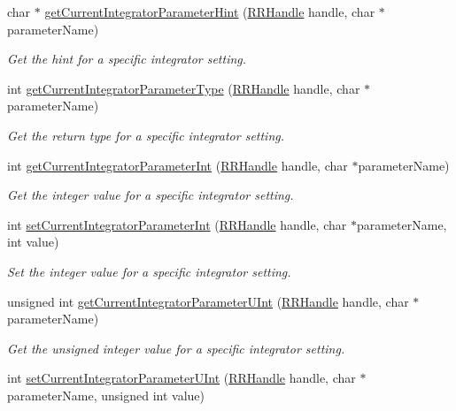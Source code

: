 \begin{DoxyCompactItemize}
char $\ast$ \hyperlink{group__simopts_ga4cc4c3b42b58f7ce266cff67cbc79c85}{get\+Current\+Integrator\+Parameter\+Hint} (\hyperlink{rrc__types_8h_a1d68f0592372208fa5a5f2799ea4b3ae}{R\+R\+Handle} handle, char $\ast$parameter\+Name)
\begin{DoxyCompactList}\small\item\em Get the hint for a specific integrator setting. \end{DoxyCompactList}\item 
int \hyperlink{group__simopts_ga04f015cae3234d1e24dc86c4ca6cf7ab}{get\+Current\+Integrator\+Parameter\+Type} (\hyperlink{rrc__types_8h_a1d68f0592372208fa5a5f2799ea4b3ae}{R\+R\+Handle} handle, char $\ast$parameter\+Name)
\begin{DoxyCompactList}\small\item\em Get the return type for a specific integrator setting. \end{DoxyCompactList}\item 
int \hyperlink{group__simopts_ga23b63638fae7a4823ac503474126c85b}{get\+Current\+Integrator\+Parameter\+Int} (\hyperlink{rrc__types_8h_a1d68f0592372208fa5a5f2799ea4b3ae}{R\+R\+Handle} handle, char $\ast$parameter\+Name)
\begin{DoxyCompactList}\small\item\em Get the integer value for a specific integrator setting. \end{DoxyCompactList}\item 
int \hyperlink{group__simopts_ga4b5b2be1b4a77b8225f5c7d9a1e0bdfb}{set\+Current\+Integrator\+Parameter\+Int} (\hyperlink{rrc__types_8h_a1d68f0592372208fa5a5f2799ea4b3ae}{R\+R\+Handle} handle, char $\ast$parameter\+Name, int value)
\begin{DoxyCompactList}\small\item\em Set the integer value for a specific integrator setting. \end{DoxyCompactList}\item 
unsigned int \hyperlink{group__simopts_ga3f5772f9a764e74036b994c290a99a86}{get\+Current\+Integrator\+Parameter\+U\+Int} (\hyperlink{rrc__types_8h_a1d68f0592372208fa5a5f2799ea4b3ae}{R\+R\+Handle} handle, char $\ast$parameter\+Name)
\begin{DoxyCompactList}\small\item\em Get the unsigned integer value for a specific integrator setting. \end{DoxyCompactList}\item 
int \hyperlink{group__simopts_gaba7305c74494496bffde25aa431ce638}{set\+Current\+Integrator\+Parameter\+U\+Int} (\hyperlink{rrc__types_8h_a1d68f0592372208fa5a5f2799ea4b3ae}{R\+R\+Handle} handle, char $\ast$parameter\+Name, unsigned int value)

\end{DoxyCompactItemize}
